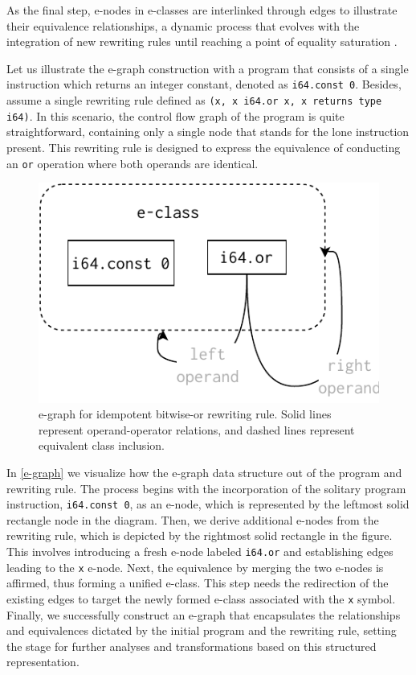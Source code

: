 As the final step, e-nodes in e-classes are interlinked through edges to illustrate their equivalence relationships, a dynamic process that evolves with the integration of new rewriting rules until reaching a point of equality saturation \cite{10.1145/1480881.1480915}.

Let us illustrate the e-graph construction with a program that consists of a single instruction which returns an integer constant, denoted as \texttt{i64.const 0}. 
Besides, assume a single rewriting rule defined as \texttt{(x, x i64.or x, x returns type i64)}.
In this scenario, the control flow graph of the program is quite straightforward, containing only a single node that stands for the lone instruction present. 
This rewriting rule is designed to express the equivalence of conducting an \texttt{or} operation where both operands are identical.



\begin{figure}
  \centering
  \includegraphics[width=0.5\linewidth]{figures/egraph1.pdf}
  \caption{e-graph for idempotent bitwise-or rewriting rule. Solid lines represent operand-operator relations, and dashed lines represent equivalent class inclusion. }
\label{e-graph}
\end{figure}


In \autoref{e-graph} we visualize how the e-graph data structure out of the program and rewriting rule.
The process begins with the incorporation of the solitary program instruction, \texttt{i64.const 0}, as an e-node, which is represented by the leftmost solid rectangle node in the diagram.
Then, we derive additional e-nodes from the rewriting rule, which is depicted by the rightmost solid rectangle in the figure. 
This involves introducing a fresh e-node labeled \texttt{i64.or} and establishing edges leading to the \texttt{x} e-node.
Next, the equivalence by merging the two e-nodes is affirmed, thus forming a unified e-class. 
This step needs the redirection of the existing edges to target the newly formed e-class associated with the \texttt{x} symbol.
Finally, we successfully construct an e-graph that encapsulates the relationships and equivalences dictated by the initial program and the rewriting rule, setting the stage for further analyses and transformations based on this structured representation.

